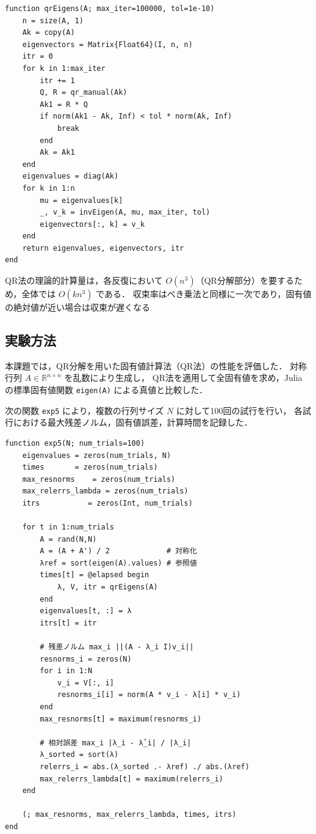 \documentclass[a4paper,11pt]{ltjsarticle}
\begin{document}
\begin{verbatim}
function qrEigens(A; max_iter=100000, tol=1e-10)
    n = size(A, 1)
    Ak = copy(A)
    eigenvectors = Matrix{Float64}(I, n, n)
    itr = 0
    for k in 1:max_iter
        itr += 1
        Q, R = qr_manual(Ak)
        Ak1 = R * Q
        if norm(Ak1 - Ak, Inf) < tol * norm(Ak, Inf)
            break
        end
        Ak = Ak1
    end
    eigenvalues = diag(Ak)
    for k in 1:n
        mu = eigenvalues[k]
        _, v_k = invEigen(A, mu, max_iter, tol)
        eigenvectors[:, k] = v_k
    end
    return eigenvalues, eigenvectors, itr
end
\end{verbatim}

QR法の理論的計算量は，各反復において $O(n^3)$（QR分解部分）を要するため，全体では $O(k n^3)$ である．
収束率はべき乗法と同様に一次であり，固有値の絶対値が近い場合は収束が遅くなる

\subsection{実験方法}

本課題では，QR分解を用いた固有値計算法（QR法）の性能を評価した．
対称行列 $A \in \mathbb{R}^{n \times n}$ を乱数により生成し，
QR法を適用して全固有値を求め，Julia の標準固有値関数 \texttt{eigen(A)} による真値と比較した．

次の関数 \verb|exp5| により，複数の行列サイズ $N$ に対して100回の試行を行い，
各試行における最大残差ノルム，固有値誤差，計算時間を記録した．

\begin{verbatim}
function exp5(N; num_trials=100)
    eigenvalues = zeros(num_trials, N)
    times       = zeros(num_trials)
    max_resnorms    = zeros(num_trials)
    max_relerrs_lambda = zeros(num_trials)
    itrs           = zeros(Int, num_trials)

    for t in 1:num_trials
        A = rand(N,N)
        A = (A + A') / 2             # 対称化
        λref = sort(eigen(A).values) # 参照値
        times[t] = @elapsed begin
            λ, V, itr = qrEigens(A)
        end
        eigenvalues[t, :] = λ
        itrs[t] = itr
        
        # 残差ノルム max_i ||(A - λ_i I)v_i||
        resnorms_i = zeros(N)
        for i in 1:N
            v_i = V[:, i]
            resnorms_i[i] = norm(A * v_i - λ[i] * v_i)
        end
        max_resnorms[t] = maximum(resnorms_i)
        
        # 相対誤差 max_i |λ_i - λ̂_i| / |λ_i|
        λ_sorted = sort(λ)
        relerrs_i = abs.(λ_sorted .- λref) ./ abs.(λref)
        max_relerrs_lambda[t] = maximum(relerrs_i)
    end

    (; max_resnorms, max_relerrs_lambda, times, itrs)
end
\end{verbatim}
\end{document}

